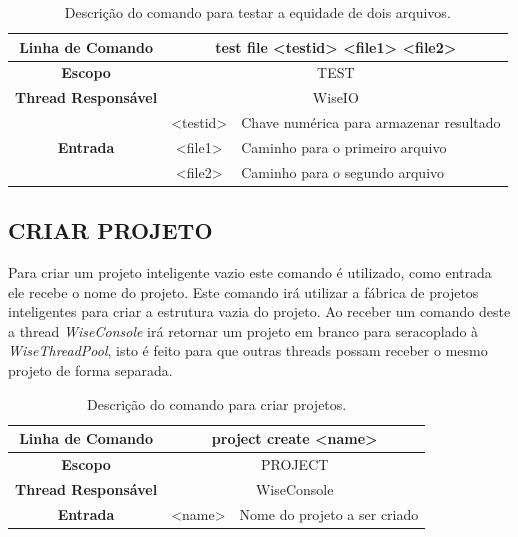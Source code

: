 \documentclass[a4paper,12pt]{monografia}
\theoremstyle{plain}
\theoremstyle{definition}
\theoremstyle{remark}
\begin{document}
\begin{center}
	\begin{table}[!htbp]
	\begin{tabular}{|c|c|m{}|}
		\hline
		\textbf{Linha de Comando} & \multicolumn{2}{c|}{test file <test\underline{\space\space}id> <file1> <file2>} \\
		\hline
		\textbf{Escopo} & \multicolumn{2}{c|}{TEST} \\
		\hline
		\textbf{Thread Responsável} & \multicolumn{2}{c|}{WiseIO} \\
		\hline
		\multirow{3}{*}{\textbf{Entrada}} & <test\underline{\space\space}id> & Chave numérica para armazenar resultado \\
		 & <file1> & Caminho para o primeiro arquivo \\
		 & <file2> & Caminho para o segundo arquivo \\
		\hline
	\end{tabular}
	\caption{Descrição do comando para testar a equidade de dois arquivos.}
	\label{tab:file_test}
	\end{table}
\end{center}

\subsection{CRIAR PROJETO}\label{sec:create_projects}

Para criar um projeto inteligente vazio este comando é utilizado, como entrada ele recebe o nome do projeto. Este comando irá utilizar a fábrica de projetos inteligentes para criar a estrutura vazia do projeto. Ao receber um comando deste a thread \textit{WiseConsole} irá retornar um projeto em branco para seracoplado à \textit{WiseThreadPool}, isto é feito para que outras threads possam receber o mesmo projeto de forma separada.

\begin{center}
\begin{table}[!htbp]
	\begin{tabular}{|c|c|m{}|}
		\hline
		\textbf{Linha de Comando} & \multicolumn{2}{c|}{project create <name>} \\
		\hline
		\textbf{Escopo} & \multicolumn{2}{c|}{PROJECT} \\
		\hline
		\textbf{Thread Responsável} & \multicolumn{2}{c|}{WiseConsole} \\
		\hline
		\textbf{Entrada} & <name> & Nome do projeto a ser criado \\
		\hline
	\end{tabular}
	\caption{Descrição do comando para criar projetos.}
	\label{tab:create_project}
\end{table}
\end{center}
\end{document}
